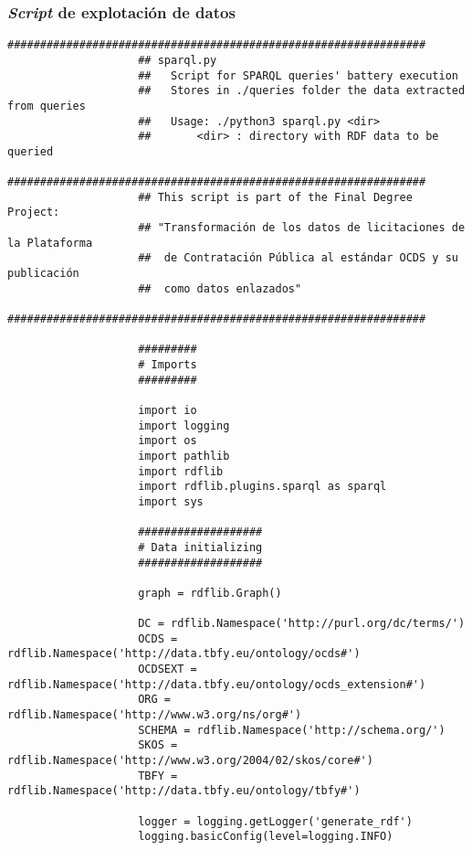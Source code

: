         \subsubsection{\textit{Script} de explotación de datos} \label{subsubsec:py2}
            \begin{minipage}{\linewidth}
                \begin{lstlisting}[language=lPython]
                    ################################################################
                    ## sparql.py
                    ##   Script for SPARQL queries' battery execution
                    ##   Stores in ./queries folder the data extracted from queries
                    ##   Usage: ./python3 sparql.py <dir>
                    ##       <dir> : directory with RDF data to be queried
                    ################################################################
                    ## This script is part of the Final Degree Project:
                    ## "Transformación de los datos de licitaciones de la Plataforma
                    ##  de Contratación Pública al estándar OCDS y su publicación
                    ##  como datos enlazados"
                    ################################################################
                    
                    #########
                    # Imports
                    #########
                    
                    import io
                    import logging
                    import os
                    import pathlib
                    import rdflib
                    import rdflib.plugins.sparql as sparql
                    import sys
                    
                    ###################
                    # Data initializing
                    ###################
                    
                    graph = rdflib.Graph()
                    
                    DC = rdflib.Namespace('http://purl.org/dc/terms/')
                    OCDS = rdflib.Namespace('http://data.tbfy.eu/ontology/ocds#')
                    OCDSEXT = rdflib.Namespace('http://data.tbfy.eu/ontology/ocds_extension#')
                    ORG = rdflib.Namespace('http://www.w3.org/ns/org#')
                    SCHEMA = rdflib.Namespace('http://schema.org/')
                    SKOS = rdflib.Namespace('http://www.w3.org/2004/02/skos/core#')
                    TBFY = rdflib.Namespace('http://data.tbfy.eu/ontology/tbfy#')
                    
                    logger = logging.getLogger('generate_rdf')
                    logging.basicConfig(level=logging.INFO)
                \end{lstlisting}
            \end{minipage}
